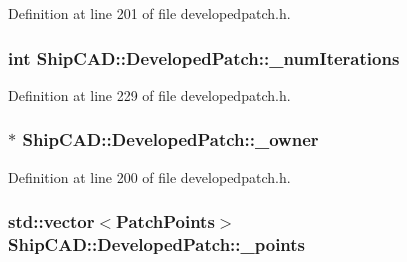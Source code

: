 Definition at line 201 of file developedpatch.\+h.

\subsubsection[{\texorpdfstring{\+\_\+num\+Iterations}{_numIterations}}]{\setlength{\rightskip}{0pt plus 5cm}int Ship\+C\+A\+D\+::\+Developed\+Patch\+::\+\_\+num\+Iterations\hspace{0.3cm}{\ttfamily [protected]}}\hypertarget{classShipCAD_1_1DevelopedPatch_ae3ef9cf6fd1e85f4739ea676b1a10aac}{}\label{classShipCAD_1_1DevelopedPatch_ae3ef9cf6fd1e85f4739ea676b1a10aac}


Definition at line 229 of file developedpatch.\+h.

\subsubsection[{\texorpdfstring{\+\_\+owner}{_owner}}]{$\ast$ Ship\+C\+A\+D\+::\+Developed\+Patch\+::\+\_\+owner\hspace{0.3cm}{\ttfamily [protected]}}\hypertarget{classShipCAD_1_1DevelopedPatch_a8ef2df371c3be810ceeabca4e0daf4b3}{}\label{classShipCAD_1_1DevelopedPatch_a8ef2df371c3be810ceeabca4e0daf4b3}


Definition at line 200 of file developedpatch.\+h.

\subsubsection[{\texorpdfstring{\+\_\+points}{_points}}]{\setlength{\rightskip}{0pt plus 5cm}std\+::vector$<${\bf Patch\+Points}$>$ Ship\+C\+A\+D\+::\+Developed\+Patch\+::\+\_\+points\hspace{0.3cm}{\ttfamily [protected]}}\hypertarget{classShipCAD_1_1DevelopedPatch_a0f6690447bc683f1ea4f4872e1309a3f}{}\label{classShipCAD_1_1DevelopedPatch_a0f6690447bc683f1ea4f4872e1309a3f}


